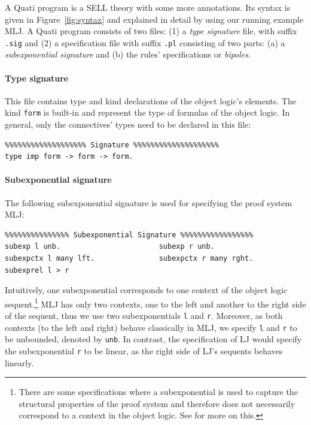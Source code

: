 \documentclass{llncs}
\begin{document}
A Quati program is a SELL theory with some more annotations. Its syntax is given
in Figure~\ref{fig:syntax} and explained in detail  
by using our running example MLJ.
%
A Quati program consists of two files: (1) a \emph{type signature} file, with
suffix \texttt{.sig} and (2) a specification file with suffix \texttt{.pl} consisting of two parts: (a) a
\emph{subexponential signature} and (b) the rules' specifications or
\emph{bipoles}.

\vspace{-2mm}

\paragraph{Type signature}
%
This file contains type and kind declarations of the object
logic's elements. The kind \texttt{form} is built-in and
represent the type of formulas of the object logic. In general, only
the connectives' types need to be declared in this file:
\vspace{-1mm}

{\small
\begin{verbatim}
%%%%%%%%%%%%%%%%%%% Signature %%%%%%%%%%%%%%%%%%%%
type imp form -> form -> form.
\end{verbatim}
}

\paragraph{Subexponential signature}
%
The following subexponential signature is used for specifying the proof system MLJ:
\vspace{-1mm}

{\small
\begin{verbatim}
%%%%%%%%%%%%%%% Subexponential Signature %%%%%%%%%%%%%%%%%
subexp l unb.                       subexp r unb.            
subexpctx l many lft.               subexpctx r many rght.
subexprel l > r
\end{verbatim}
}

Intuitively, one subexponential corresponds to one context of the object logic sequent.\footnote{There are 
some specifications where a subexponential is used to capture the structural properties of the proof 
system and therefore does not necessarily correspond to a context in the object logic. See \cite{nigam.jlc}
for more on this.}
MLJ has only two contexts, one to the left and another to the right side of the
sequent, thus we use two subexponentials
\texttt{l} and \texttt{r}. Moreover, as both contexts (to the left and right) behave classically in MLJ, 
we specify \texttt{l} and \texttt{r} to be unbounded, denoted by \texttt{unb}. In contrast, 
the specification of LJ would specify the subexponential \texttt{r} to be linear, as the right side of LJ's 
sequents behaves linearly.
\end{document}
